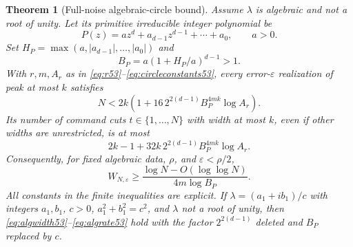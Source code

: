 \documentclass[11pt]{amsart}
\numberwithin{equation}{section}
\newtheorem{theorem}{Theorem}[section]
\theoremstyle{definition}
\theoremstyle{remark}
\begin{document}
\begin{theorem}[Full-noise algebraic-circle bound]\label{thm:algebraic53}
Assume $\lambda$ is algebraic and not a root of unity. Let its primitive irreducible integer polynomial be
\[
 P(z)=a z^d+a_{d-1}z^{d-1}+\cdots+a_0,\qquad a>0.
\]
Set $H_P=\max(a,|a_{d-1}|,\ldots,|a_0|)$ and
\[
                     B_P=a(1+H_P/a)^{d-1}>1.
\]
With $r,m,A_r$ as in \eqref{eq:r53}--\eqref{eq:circleconstants53}, every error-$\varepsilon$ realization of peak at most $k$ satisfies
\begin{equation}\label{eq:algwidth53}
 N<2k\left(1+16\,2^{2(d-1)}B_P^{4mk}\log A_r\right).
\end{equation}
Its number of command cuts $t\in\{1,\ldots,N\}$ with width at most $k$, even if other widths are unrestricted, is at most
\begin{equation}\label{eq:algoccupation53}
 2k-1+32k\,2^{2(d-1)}B_P^{4mk}\log A_r.
\end{equation}
Consequently, for fixed algebraic data, $\rho$, and $\varepsilon<\rho/2$,
\begin{equation}\label{eq:algrate53}
 W_{N,\varepsilon}\ge
 \frac{\log N-O(\log\log N)}{4m\log B_P}.
\end{equation}
All constants in the finite inequalities are explicit. If $\lambda=(a_1+ib_1)/c$ with integers $a_1,b_1$, $c>0$, $a_1^2+b_1^2=c^2$, and $\lambda$ not a root of unity, then \eqref{eq:algwidth53}--\eqref{eq:algrate53} hold with the factor $2^{2(d-1)}$ deleted and $B_P$ replaced by $c$.
\end{theorem}
\end{document}
